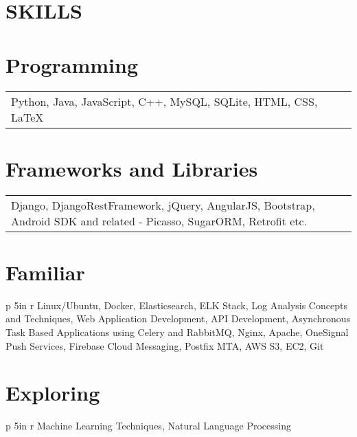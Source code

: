 \documentclass[margin]{res}
\begin{document}
\begin{resume}
\section{SKILLS} 
\normalsize{\section{Programming}}
                 \begin{tabular}{p{5in} r}
                 Python, Java, JavaScript, C++, MySQL, SQLite, HTML, CSS, LaTeX
                 \end{tabular}
\normalsize{\section{Frameworks and Libraries}} 
                 \begin{tabular}{p{5in} r}
                  Django, DjangoRestFramework, jQuery, AngularJS, Bootstrap, Android SDK and related - Picasso, SugarORM, Retrofit etc.
                  \end{tabular}
\normalsize{\section{Familiar}}
	           \begin{tabular}{p {5in} r}
                   Linux/Ubuntu, Docker, Elasticsearch, ELK Stack, Log Analysis Concepts and Techniques, Web Application Development, API Development, Asynchronous Task Based Applications using Celery and RabbitMQ, Nginx, Apache, OneSignal Push Services, Firebase Cloud Messaging, Postfix MTA, AWS S3, EC2, Git
                   \end{tabular}
\normalsize{\section{Exploring}}
                  \begin{tabular}{p {5in} r}
                  Machine Learning Techniques, Natural Language Processing
                  \end{tabular}
 

\end{resume}
\end{document}
